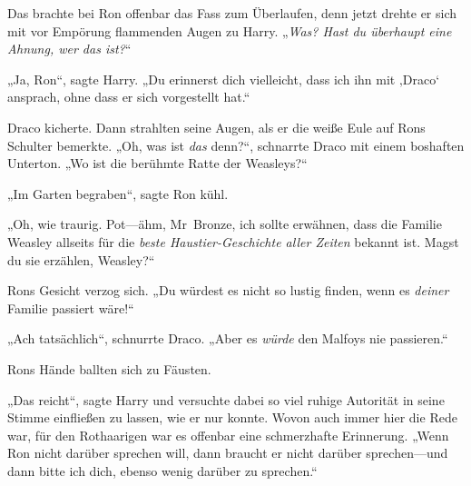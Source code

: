 Das brachte bei Ron offenbar das Fass zum Überlaufen, denn jetzt drehte er sich mit vor Empörung flammenden Augen zu Harry. „\emph{Was? Hast du überhaupt eine \emph{Ahnung}, wer das ist?}“

„Ja, Ron“, sagte Harry. „Du erinnerst dich vielleicht, dass ich ihn mit ‚Draco‘ ansprach, ohne dass er sich vorgestellt hat.“

Draco kicherte. Dann strahlten seine Augen, als er die weiße Eule auf Rons Schulter bemerkte. „Oh, was ist \emph{das} denn?“, schnarrte Draco mit einem boshaften Unterton. „Wo ist die berühmte Ratte der Weasleys?“

„Im Garten begraben“, sagte Ron kühl.

„Oh, wie traurig. Pot—ähm, Mr~Bronze, ich sollte erwähnen, dass die Familie Weasley allseits für die \emph{beste Haustier-Geschichte aller Zeiten} bekannt ist. Magst du sie erzählen, Weasley?“

Rons Gesicht verzog sich. „Du würdest es nicht so lustig finden, wenn es \emph{deiner} Familie passiert wäre!“

„Ach tatsächlich“, schnurrte Draco. „Aber es \emph{würde} den Malfoys nie passieren.“

Rons Hände ballten sich zu Fäusten.

„Das reicht“, sagte Harry und versuchte dabei so viel ruhige Autorität in seine Stimme einfließen zu lassen, wie er nur konnte. Wovon auch immer hier die Rede war, für den Rothaarigen war es offenbar eine schmerzhafte Erinnerung. „Wenn Ron nicht darüber sprechen will, dann braucht er nicht darüber sprechen—und dann bitte ich dich, ebenso wenig darüber zu sprechen.“

